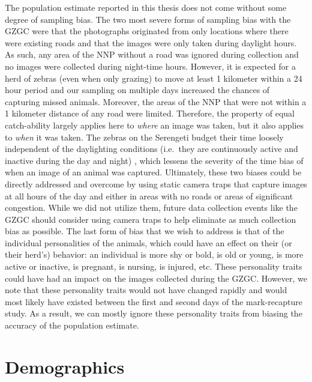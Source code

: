 The population estimate reported in this thesis does not come without some degree of sampling bias.  The two most severe forms of sampling bias with the GZGC were that the photographs originated from only locations where there were existing roads and that the images were only taken during daylight hours.  As such, any area of the NNP without a road was ignored during collection and no images were collected during night-time hours.  However, it is expected for a herd of zebras (even when only grazing) to move at least 1 kilometer within a 24 hour period \cite{juang_energy-efficient_2002, macedo_ecology_2010} and our sampling on multiple days increased the chances of capturing missed animals.  Moreover, the areas of the NNP that were not within a 1 kilometer distance of any road were limited.  Therefore, the property of equal catch-ability \cite{seber_estimation_1982, white_program_1999} largely applies here to \textit{where} an image was taken, but it also applies to \textit{when} it was taken.  The zebras on the Serengeti budget their time loosely independent of the daylighting conditions (i.e.\ they are continuously active and inactive during the day and night) \cite{becker_mother-infant_1990, kivai_feeding_2006, rubenstein_ecology_1994}, which lessens the severity of the time bias of when an image of an animal was captured.  Ultimately, these two biases could be directly addressed and overcome by using static camera traps that capture images at all hours of the day and either in areas with no roads or areas of significant congestion.  While we did not utilize them, future data collection events like the GZGC should consider using camera traps to help eliminate as much collection bias as possible.  The last form of bias that we wish to address is that of the individual personalities of the animals, which could have an effect on their (or their herd's) behavior: an individual is more shy or bold, is old or young, is more active or inactive, is pregnant, is nursing, is injured, etc.  These personality traits could have had an impact on the images collected during the GZGC.  However, we note that these personality traits would not have changed rapidly and would most likely have existed between the first and second days of the mark-recapture study.  As a result, we can mostly ignore these personality traits from biasing the accuracy of the population estimate.

\section{Demographics}

